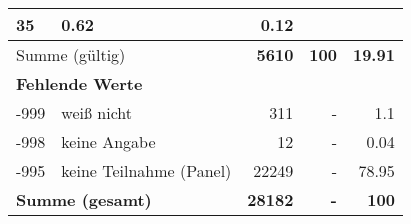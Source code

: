 \begin{longtable}{lXrrr}
       \num{35} &
       \num[round-mode=places,round-precision=2]{0.62} &
         \num[round-mode=places,round-precision=2]{0.12} \\
     \midrule
     \multicolumn{2}{l}{Summe (gültig)} &
       \textbf{\num{5610}} &
     \textbf{\num{100}} &
       \textbf{\num[round-mode=places,round-precision=2]{19.91}} \\
     \multicolumn{5}{l}{\textbf{Fehlende Werte}}\\
       -999 &
       weiß nicht &
         \num{311} &
        - &
         \num[round-mode=places,round-precision=2]{1.1} \\
       -998 &
       keine Angabe &
         \num{12} &
        - &
         \num[round-mode=places,round-precision=2]{0.04} \\
       -995 &
       keine Teilnahme (Panel) &
         \num{22249} &
        - &
         \num[round-mode=places,round-precision=2]{78.95} \\
     \midrule
     \multicolumn{2}{l}{\textbf{Summe (gesamt)}} &
          \textbf{\num{28182}} &
        \textbf{-} &
        \textbf{\num{100}} \\
     \bottomrule
     \end{longtable}
     
